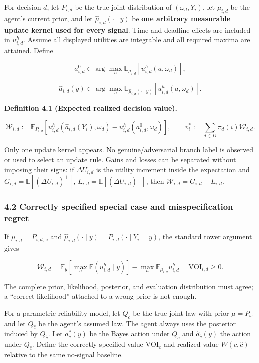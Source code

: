 \documentclass[
  11pt]{article}
\begin{document}
For decision \(d\), let \(P_{i,d}\) be the true joint distribution of
\((\omega_d,Y_i)\), let \(\mu_{i,d}\) be the agent's current prior, and
let \(\widehat\mu_{i,d}(\cdot\mid y)\) be \textbf{one arbitrary
measurable update kernel used for every signal}. Time and deadline
effects are included in \(u^h_{i,d}\). Assume all displayed utilities
are integrable and all required maxima are attained. Define

\[a^0_{i,d}\in\arg\max_a\mathbb E_{\mu_{i,d}}[u^h_{i,d}(a,\omega_d)],\]

\[\widehat a_{i,d}(y)\in\arg\max_a\mathbb E_{\widehat\mu_{i,d}(\cdot\mid y)}[u^h_{i,d}(a,\omega_d)].\]

\textbf{Definition 4.1 (Expected realized decision value).}

\[\mathcal W_{i,d}:=\mathbb E_{P_{i,d}}\!\left[u^h_{i,d}(\widehat a_{i,d}(Y_i),\omega_d)-u^h_{i,d}(a^0_{i,d},\omega_d)\right],\qquad v_i^*:=\sum_{d\in D}\pi_d(i)\mathcal W_{i,d}.\]

Only one update kernel appears. No genuine/adversarial branch label is
observed or used to select an update rule. Gains and losses can be
separated without imposing their signs: if \(\Delta U_{i,d}\) is the
utility increment inside the expectation and
\(G_{i,d}=\mathbb E[(\Delta U_{i,d})^+]\),
\(L_{i,d}=\mathbb E[(\Delta U_{i,d})^-]\), then
\(\mathcal W_{i,d}=G_{i,d}-L_{i,d}\).

\subsubsection{4.2 Correctly specified special case and misspecification
regret}\label{correctly-specified-special-case-and-misspecification-regret}

If \(\mu_{i,d}=P_{i,d,\omega}\) and
\(\widehat\mu_{i,d}(\cdot\mid y)=P_{i,d}(\cdot\mid Y_i=y)\), the
standard tower argument gives

\[\mathcal W_{i,d}=\mathbb E_y\!\left[\max_a\mathbb E(u^h_{i,d}\mid y)\right]-\max_a\mathbb E_{\mu_{i,d}}u^h_{i,d}=\mathrm{VOI}_{i,d}\ge0.\]

The complete prior, likelihood, posterior, and evaluation distribution
must agree; a ``correct likelihood'' attached to a wrong prior is not
enough.

For a parametric reliability model, let \(Q_c\) be the true joint law
with prior \(\mu=P_\omega\) and let \(Q_{\hat c}\) be the agent's
assumed law. The agent always uses the posterior induced by
\(Q_{\hat c}\). Let \(a_c^*(y)\) be the Bayes action under \(Q_c\) and
\(\widehat a_{\hat c}(y)\) the action under \(Q_{\hat c}\). Define the
correctly specified value \(\mathrm{VOI}_c\) and realized value
\(W(c,\hat c)\) relative to the same no-signal baseline.
\end{document}
